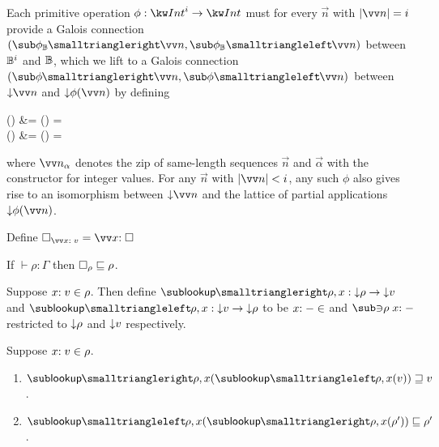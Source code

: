 Each primitive operation $\phi: \tyInt^{i} \to \tyInt$ must for every $\vec{n}$ with $\length{\vec{n}} = i$ provide a Galois connection $(\primFwdBool{\phi}{\vec{n}}, \primBwdBool{\phi}{\vec{n}})$ between $\mathbb{B}^i$ and $\mathbb{B}$, which we lift to a Galois connection $(\primFwd{\phi}{\vec{n}}, \primBwd{\phi}{\vec{n}})$ between $\Below{\vec{n}}$ and $\Below{\phi(\vec{n})}$ by defining
\begin{definition}
\label{def:core-language:primop-gc}
\begin{salign}
   () &= 
   (\vec{\alpha}) = \beta
   \\
   () &= 
   (\beta) = \vec{\alpha}
\end{salign}
\end{definition}

\noindent where $\vec{\annInt{n}{\alpha}}$ denotes the zip of same-length sequences $\vec{n}$ and $\vec{\alpha}$ with the constructor for integer values. For any $\vec{n}$ with $\length{\vec{n}} \numlt i$, any such $\phi$ also gives rise to an isomorphism between $\Below{\vec{n}}$ and the lattice of partial applications $\Below{\exPrimOp{\phi}{\vec{n}}}$.





\begin{definition}
Define $\hole_{\vec{\bind{x}{v}}} = \vec{\bind{x}{\hole}}$
\end{definition}

\begin{lemma}
\label{lem:core-language:hole-env}If $\vdash \rho: \Gamma$ then $\square_{\rho} \sqsubseteq \rho$.
\end{lemma}

\begin{definition}
   Suppose $x{:}\;v\in{\rho}$. Then define $\envLookupFwdF{\rho,x}: \Below{\rho} \to \Below{v}$ and $\envLookupBwdF{\rho,x}: \Below{v} \to \Below{\rho}$ to be $x{:}\;-\in$ and $\envLookupBwdR{\rho}\bind{x}{-}$ restricted to ${\downarrow}{\rho}$ and ${\downarrow}{v}$ respectively.
\end{definition}

\begin{lemma}
\label{lem:core-language:env-get-put}Suppose $x{:}\;v\in{\rho}$.
\begin{enumerate}
   \item \label{lem:core-language:env-get-put:1} $\envLookupFwdF{\rho,x}(\envLookupBwdF{\rho,x}(v)) \geq v$.
   \item \label{lem:core-language:env-get-put:2} $\envLookupBwdF{\rho,x}(\envLookupFwdF{\rho,x}(\rho')) \leq \rho'$.
\end{enumerate}
\end{lemma}

